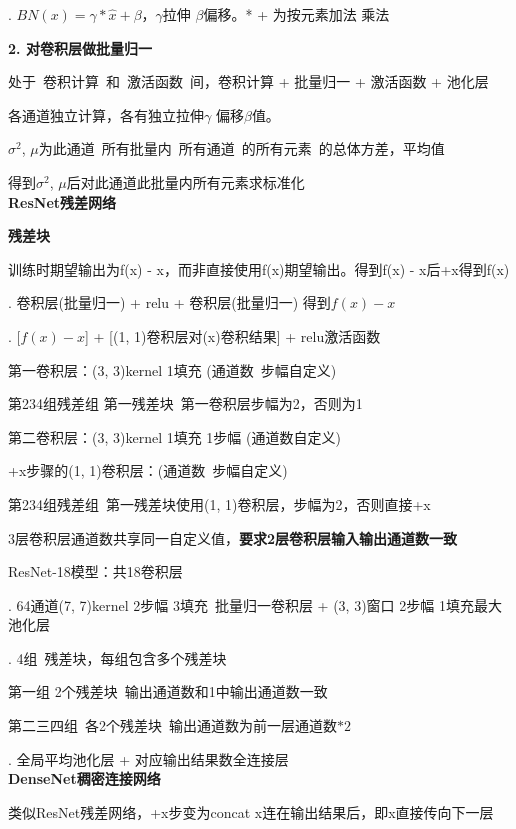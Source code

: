 \documentclass[UTF8]{ctexart}
\begin{document}
  . $BN(x) = \gamma * \hat{x} + \beta $，$\gamma$拉伸 $\beta$偏移。* + 为按元素加法 乘法

  \textbf{2. 对卷积层做批量归一}

  \quad 处于\ 卷积计算\ 和\ 激活函数\ 间，卷积计算 + 批量归一 + 激活函数 + 池化层

  \quad 各通道独立计算，各有独立拉伸$\gamma$ 偏移$\beta$值。
  
  \quad $\sigma^2$, $\mu$为此通道\ 所有批量内\ 所有通道\ 的所有元素\ 的总体方差，平均值

  \quad 得到$\sigma^2$, $\mu$后对此通道此批量内所有元素求标准化\\
\textbf{ResNet残差网络}

  \textbf{残差块}

  \quad 训练时期望输出为f(x) - x，而非直接使用f(x)期望输出。得到f(x) - x后+x得到f(x)

  . 卷积层(批量归一) + relu + 卷积层(批量归一) 得到$f(x) - x$
  
  . [$f(x) - x$] + [(1, 1)卷积层对(x)卷积结果] + relu激活函数
  
  \quad \quad 第一卷积层：(3, 3)kernel 1填充 (通道数\ 步幅自定义)

  \quad \quad \quad 第234组残差组 第一残差块\ 第一卷积层步幅为2，否则为1

  \quad \quad 第二卷积层：(3, 3)kernel 1填充 1步幅 (通道数自定义)

  \quad \quad +x步骤的(1, 1)卷积层：(通道数\ 步幅自定义) 

  \quad \quad \quad 第234组残差组\ 第一残差块使用(1, 1)卷积层，步幅为2，否则直接+x

  \quad \quad 3层卷积层通道数共享同一自定义值，\textbf{要求2层卷积层输入输出通道数一致}

  ResNet-18模型：共18卷积层

  . 64通道(7, 7)kernel 2步幅 3填充\ 批量归一卷积层 + (3, 3)窗口 2步幅 1填充最大池化层

  . 4组\ 残差块，每组包含多个残差块

  \quad \quad 第一组 2个残差块\ 输出通道数和1中输出通道数一致
  
  \quad \quad 第二三四组\ 各2个残差块\ 输出通道数为前一层通道数$*2$

  . 全局平均池化层 + 对应输出结果数全连接层\\
\textbf{DenseNet稠密连接网络}

  类似ResNet残差网络，+x步变为concat x连在输出结果后，即x直接传向下一层
\end{document}
